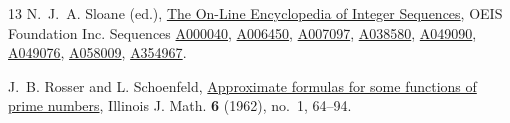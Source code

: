 \documentclass[11pt,a4paper]{article}
\theoremstyle{plain}
\theoremstyle{definition}
\begin{document}
\begin{thebibliography}{13}
N.~J.~A. Sloane (ed.),
\href{https://oeis.org}{The On-Line Encyclopedia of Integer Sequences},
OEIS Foundation Inc. Sequences
\href{https://oeis.org/A000040}{A000040},
\href{https://oeis.org/A006450}{A006450},
\href{https://oeis.org/A007097}{A007097},
\href{https://oeis.org/A038580}{A038580},
\href{https://oeis.org/A049090}{A049090},
\href{https://oeis.org/A049076}{A049076},
\href{https://oeis.org/A058009}{A058009},
\href{https://oeis.org/A354967}{A354967}.

J.~B. Rosser and L. Schoenfeld,
\href{https://doi.org/10.1215/ijm/1255631807}{Approximate formulas for some
functions of prime numbers}, Illinois J. Math. \textbf{6} (1962), no.~1,
64--94.

\end{thebibliography}
\end{document}
